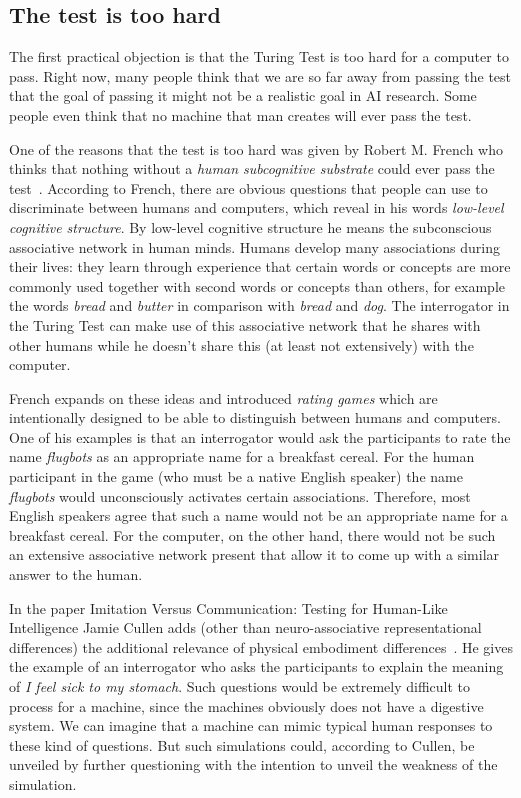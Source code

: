 \subsection{The test is too hard}
The first practical objection is that the Turing Test is too hard for a computer to pass. Right now, many people think that we are so far away from passing the test that the goal of passing it might not be a realistic goal in AI research. Some people even think that no machine that man creates will ever pass the test.

One of the reasons that the test is too hard was given by Robert M. French who thinks that nothing without a \textit{human subcognitive substrate} could ever pass the test~\cite{french1996subcognition}. According to French, there are obvious questions that people can use to discriminate between humans and computers, which reveal in his words \textit{low-level cognitive structure}. By low-level cognitive structure he means the subconscious associative network in human minds. Humans develop many associations during their lives: they learn through experience that certain words or concepts are more commonly used together with second words or concepts than others, for example the words \textit{bread} and \textit{butter} in comparison with \textit{bread} and \textit{dog}. The interrogator in the Turing Test can make use of this associative network that he shares with other humans while he doesn't share this (at least not extensively) with the computer.

French expands on these ideas and introduced \textit{rating games} which are intentionally designed to be able to distinguish between humans and computers. One of his examples is that an interrogator would ask the participants to rate the name \textit{flugbots} as an appropriate name for a breakfast cereal. For the human participant in the game (who must be a native English speaker) the name \textit{flugbots} would unconsciously activates certain associations. Therefore, most English speakers agree that such a name would not be an appropriate name for a breakfast cereal. For the computer, on the other hand, there would not be such an extensive associative network present that allow it to come up with a similar answer to the human.

In the paper Imitation Versus Communication: Testing for Human-Like Intelligence Jamie Cullen adds (other than neuro-associative representational differences) the additional relevance of physical embodiment differences~\cite{cullen2009imitation}. He gives the example of an interrogator who asks the participants to explain the meaning of \textit{I feel sick to my stomach}. Such questions would be extremely difficult to process for a machine, since the machines obviously does not have a digestive system. We can imagine that a machine can mimic typical human responses to these kind of questions. But such simulations could, according to Cullen, be unveiled by further questioning with the intention to unveil the weakness of the simulation.

